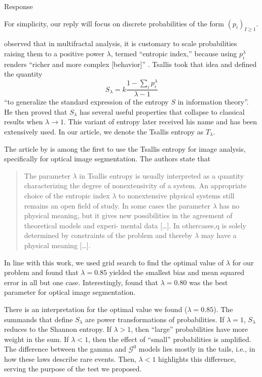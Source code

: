 \documentclass[11pt]{report}
\begin{document}
\begin{responsebox}{Response}

For simplicity, our reply will focus on discrete probabilities of the form $(p_i)_{I\geq 1}$.

\citet{Tsallis1988} observed that in multifractal analysis, it is customary to scale probabilities raising them to a positive power $\lambda$, termed ``entropic index,'' because using $p_i^\lambda$ renders ``richer and more complex [behavior]'' \citep{FractalMeasuresandTheirSingularitiestheCharacterizationofStrangeSets}.
Tsallis took that idea and defined the quantity 
$$
S_\lambda = k \frac{1-\sum_{i} p_i^\lambda}{\lambda-1}
$$
``to generalize the standard expression of the entropy $S$ in information theory''.
He then proved that $S_\lambda$ has several useful properties that collapse to classical results when $\lambda\to1$.
This variant of entropy later received his name and has been extensively used.
In our article, we denote the Tsallis entropy as $T_\lambda$.

The article by \citet{ImageThresholdingUsingTsallisEntropy} is among the first to use the Tsallis entropy for image analysis, specifically for optical image segmentation.
The authors state that
\begin{quote}
The parameter $\lambda$ in Tsallis entropy is usually
interpreted as a quantity characterizing the degree
of nonextensivity of a system. An appropriate
choice of the entropic index $\lambda$ to nonextensive
physical systems still remains an open field of
study. In some cases the parameter $\lambda$ has no
physical meaning, but it gives new possibilities in
the agreement of theoretical models and experi-
mental data [\dots]. In
othercases,q is solely determined by constraints of
the problem and thereby $\lambda$ may have a physical
meaning [\dots].
\end{quote}
In line with this work, we used grid search to find the optimal value of $\lambda$ for our problem and found that $\lambda=0.85$ yielded the smallest bias and mean squared error in all but one case.
Interestingly, \citet{TheApplicationofTsallisEntropyBasedSelfAdaptiveAlgorithmforMultiThresholdImageSegmentation} found that $\lambda=0.80$ was the best parameter for optical image segmentation.

There is an interpretation for the optimal value we found ($\lambda=0.85$).
The summands that define $S_\lambda$ are power transformations of probabilities.
If $\lambda=1$, $S_\lambda$ reduces to the Shannon entropy.
If $\lambda>1$, then ``large'' probabilities have more weight in the sum.
If $\lambda<1$, then the effect of ``small'' probabilities is amplified.
The difference between the gamma and $\mathcal G^0$ models lies mostly in the tails, i.e., in how these laws describe rare events.
Then, $\lambda<1$ highlights this difference, serving the purpose of the test we proposed.


\end{responsebox}
\end{document}
